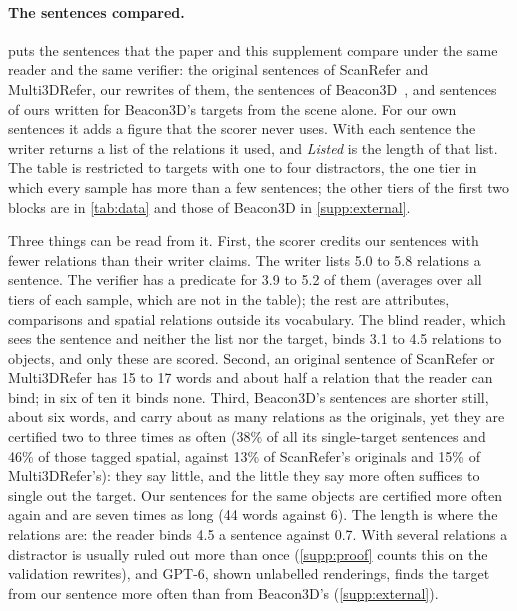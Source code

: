\paragraph{The sentences compared.}
 puts the sentences that the paper and this supplement compare under the same reader and the same verifier: the original sentences of ScanRefer and Multi3DRefer, our rewrites of them, the sentences of Beacon3D~\cite{beacon3d}, and sentences of ours written for Beacon3D's targets from the scene alone.
For our own sentences it adds a figure that the scorer never uses.
With each sentence the writer returns a list of the relations it used, and \emph{Listed} is the length of that list.
The table is restricted to targets with one to four distractors, the one tier in which every sample has more than a few sentences; the other tiers of the first two blocks are in \cref{tab:data} and those of Beacon3D in \cref{supp:external}.

Three things can be read from it.
First, the scorer credits our sentences with fewer relations than their writer claims.
The writer lists 5.0 to 5.8 relations a sentence.
The verifier has a predicate for 3.9 to 5.2 of them (averages over all tiers of each sample, which are not in the table); the rest are attributes, comparisons and spatial relations outside its vocabulary.
The blind reader, which sees the sentence and neither the list nor the target, binds 3.1 to 4.5 relations to objects, and only these are scored.
Second, an original sentence of ScanRefer or Multi3DRefer has 15 to 17 words and about half a relation that the reader can bind; in six of ten it binds none.
Third, Beacon3D's sentences are shorter still, about six words, and carry about as many relations as the originals, yet they are certified two to three times as often (38\% of all its single-target sentences and 46\% of those tagged spatial, against 13\% of ScanRefer's originals and 15\% of Multi3DRefer's): they say little, and the little they say more often suffices to single out the target.
Our sentences for the same objects are certified more often again and are seven times as long (44 words against 6).
The length is where the relations are: the reader binds 4.5 a sentence against 0.7.
With several relations a distractor is usually ruled out more than once (\cref{supp:proof} counts this on the validation rewrites), and GPT-6, shown unlabelled renderings, finds the target from our sentence more often than from Beacon3D's (\cref{supp:external}).

